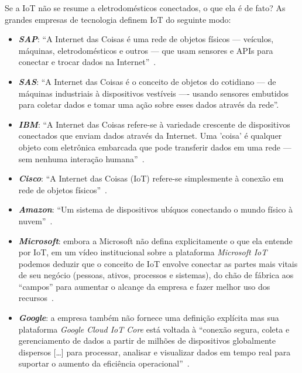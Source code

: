 \documentclass[pdftex, brazil, 12pt, twoside]{article}
\begin{document}
Se a IoT não se resume a eletrodomésticos conectados, o que ela é de fato? As
grandes empresas de tecnologia definem IoT do seguinte modo:

\begin{itemize}
\item \emph{\textbf{SAP}}: ``A Internet das Coisas é uma rede de objetos físicos --- veículos,
  máquinas, eletrodomésticos e outros --- que usam sensores e APIs para conectar e
  trocar dados na Internet''~\citep{SAPWhatIoT}.
\item \emph{\textbf{SAS}}: ``A Internet das Coisas é o conceito de objetos do cotidiano --- de
  máquinas industriais à dispositivos vestíveis ---- usando sensores embutidos para coletar
  dados e tomar uma ação sobre esses dados através da rede''\citep{SASWhatIoT}.
\item \emph{\textbf{IBM}}: ``A Internet das Coisas refere-se à variedade crescente
  de dispositivos conectados que enviam dados através da Internet. Uma 'coisa' é qualquer
  objeto com eletrônica embarcada que pode transferir dados em uma rede --- sem nenhuma
  interação humana''~\citep{IBMWhatIsIoT,IBMWhatsonIoT}.
\item \emph{\textbf{Cisco}}: ``A Internet das Coisas (IoT) refere-se simplesmente à conexão
  em rede de objetos físicos''~\citep{CiscoIoTVS2013}.
\item \emph{\textbf{Amazon}}: ``Um sistema de dispositivos ubíquos conectando o mundo
  físico à nuvem''~\citep{AmazonIoT}.
\item \emph{\textbf{Microsoft}}: embora a Microsoft não defina explicitamente o que
  ela entende por IoT, em um vídeo institucional sobre a plataforma \emph{Microsoft IoT}
  podemos deduzir que o conceito de IoT envolve conectar as partes mais vitais de
  seu negócio (pessoas, ativos, processos e sistemas), do chão de fábrica aos ``campos''
  para aumentar o alcançe da empresa e fazer melhor uso dos recursos~\citep{MicrosoftIoT}.
\item \emph{\textbf{Google}}: a empresa também não fornece uma definição explícita mas
  sua plataforma \emph{Google Cloud IoT Core} está voltada à ``conexão segura, coleta e
  gerenciamento de dados a partir de milhões de dispositivos globalmente dispersos [\ldots]
  para processar, analisar e visualizar dados em tempo real para suportar o aumento
  da eficiência operacional''~\citep{GoogleWhatsIoT}.
\end{itemize}




\end{document}
